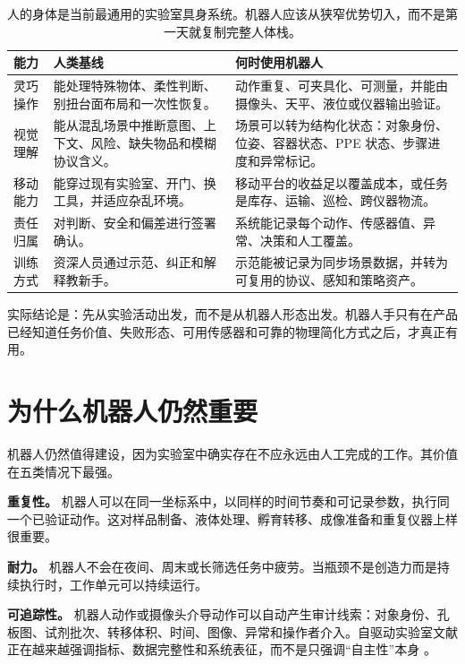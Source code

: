 \documentclass[11pt,fontset=none]{ctexart}
\begin{document}
\begin{table}[htbp]
\centering
\small
\begin{tabularx}{\linewidth}{@{}L{2.55cm}Y Y@{}}
\toprule
\textbf{能力} & \textbf{人类基线} & \textbf{何时使用机器人} \\
\midrule
灵巧操作 & 能处理特殊物体、柔性判断、别扭台面布局和一次性恢复。 & 动作重复、可夹具化、可测量，并能由摄像头、天平、液位或仪器输出验证。 \\
视觉理解 & 能从混乱场景中推断意图、上下文、风险、缺失物品和模糊协议含义。 & 场景可以转为结构化状态：对象身份、位姿、容器状态、PPE 状态、步骤进度和异常标记。 \\
移动能力 & 能穿过现有实验室、开门、换工具，并适应杂乱环境。 & 移动平台的收益足以覆盖成本，或任务是库存、运输、巡检、跨仪器物流。 \\
责任归属 & 对判断、安全和偏差进行签署确认。 & 系统能记录每个动作、传感器值、异常、决策和人工覆盖。 \\
训练方式 & 资深人员通过示范、纠正和解释教新手。 & 示范能被记录为同步场景数据，并转为可复用的协议、感知和策略资产。 \\
\bottomrule
\end{tabularx}
\caption{人的身体是当前最通用的实验室具身系统。机器人应该从狭窄优势切入，而不是第一天就复制完整人体栈。}
\label{tab:human-robot-comparison-cn}
\end{table}

实际结论是：先从实验活动出发，而不是从机器人形态出发。机器人手只有在产品已经知道任务价值、失败形态、可用传感器和可靠的物理简化方式之后，才真正有用。

\section{为什么机器人仍然重要}

机器人仍然值得建设，因为实验室中确实存在不应永远由人工完成的工作。其价值在五类情况下最强。

\textbf{重复性。} 机器人可以在同一坐标系中，以同样的时间节奏和可记录参数，执行同一个已验证动作。这对样品制备、液体处理、孵育转移、成像准备和重复仪器上样很重要。

\textbf{耐力。} 机器人不会在夜间、周末或长筛选任务中疲劳。当瓶颈不是创造力而是持续执行时，工作单元可以持续运行。

\textbf{可追踪性。} 机器人动作或摄像头介导动作可以自动产生审计线索：对象身份、孔板图、试剂批次、转移体积、时间、图像、异常和操作者介入。自驱动实验室文献正在越来越强调指标、数据完整性和系统表征，而不是只强调“自主性”本身 \cite{volk2024metrics}。
\end{document}
